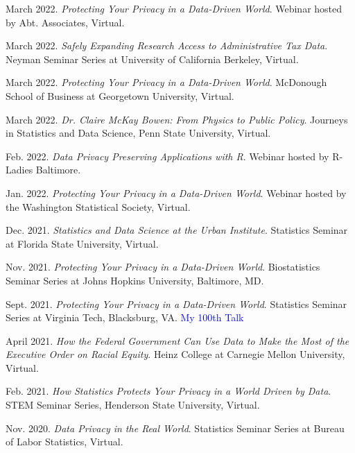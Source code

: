\begin{etaremune}[topsep=0pt, itemsep=4pt, partopsep=0pt, parsep=0pt]
    \item March 2022. \textit{Protecting Your Privacy in a Data-Driven World}. Webinar hosted by Abt. Associates, Virtual.
    
    \item March 2022. \textit{Safely Expanding Research Access to Administrative Tax Data}. Neyman Seminar Series at University of California Berkeley, Virtual.
    
    \item March 2022. \textit{Protecting Your Privacy in a Data-Driven World}. McDonough School of Business at Georgetown University, Virtual.
    
    \item March 2022. \textit{Dr. Claire McKay Bowen: From Physics to Public Policy}. Journeys in Statistics and Data Science, Penn State University, Virtual.
        
    \item Feb. 2022. \textit{Data Privacy Preserving Applications with R}. Webinar hosted by R-Ladies Baltimore.

    \item Jan. 2022. \textit{Protecting Your Privacy in a Data-Driven World}. Webinar hosted by the Washington Statistical Society, Virtual.
    
    \item Dec. 2021. \textit{Statistics and Data Science at the Urban Institute}. Statistics Seminar at Florida State University, Virtual.
    
    \item Nov. 2021. \textit{Protecting Your Privacy in a Data-Driven World}. Biostatistics Seminar Series at Johns Hopkins University, Baltimore, MD.
    
    \item Sept. 2021. \textit{Protecting Your Privacy in a Data-Driven World}. Statistics Seminar Series at Virginia Tech, Blacksburg, VA. \textcolor{blue}{My 100th Talk}
    
    \item April 2021. \textit{How the Federal Government Can Use Data to Make the Most of the Executive Order on Racial Equity}. Heinz College at Carnegie Mellon University, Virtual.

    \item Feb. 2021. \textit{How Statistics Protects Your Privacy in a World Driven by Data}. STEM Seminar Series, Henderson State University, Virtual.

    \item Nov. 2020. \textit{Data Privacy in the Real World}. Statistics Seminar Series at Bureau of Labor Statistics, Virtual.


\end{etaremune}
